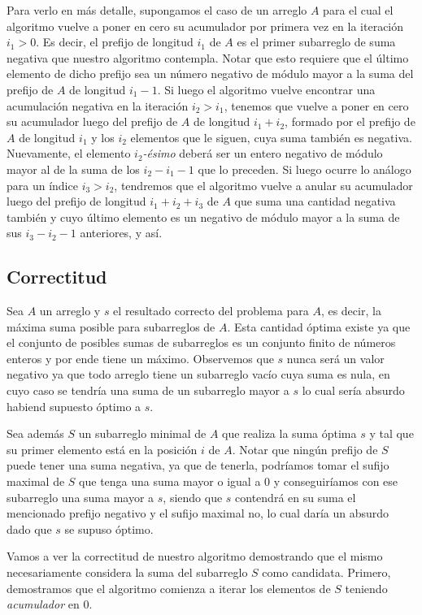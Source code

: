 Para verlo en más detalle, supongamos el caso de un arreglo $A$ para el cual el algoritmo vuelve a poner en cero su acumulador por primera vez en la iteración $i_1 > 0$. Es decir, el prefijo de longitud $i_1$ de $A$ es el primer subarreglo de suma negativa que nuestro algoritmo contempla. Notar que esto requiere que el último elemento de dicho prefijo sea un número negativo de módulo mayor a la suma del prefijo de $A$ de longitud $i_1-1$. Si luego el algoritmo vuelve encontrar una acumulación negativa en la iteración $i_2 > i_1$, tenemos que vuelve a poner en cero su acumulador luego del prefijo de $A$ de longitud $i_1 + i_2$, formado por el prefijo de $A$ de longitud $i_1$ y los $i_2$ elementos que le siguen, cuya suma también es negativa. Nuevamente, el elemento $i_2$\textit{-ésimo} deberá ser un entero negativo de módulo mayor al de la suma de los $i_2-i_1-1$ que lo preceden. Si luego ocurre lo análogo para un índice $i_3 > i_2$, tendremos que el algoritmo vuelve a anular su acumulador luego del prefijo de longitud $i_1 + i_2 + i_3$ de $A$ que suma una cantidad negativa también y cuyo último elemento es un negativo de módulo mayor a la suma de sus $i_3-i_2-1$ anteriores, y así.

\subsection{Correctitud}

Sea $A$ un arreglo y $s$ el resultado correcto del problema para $A$, es decir, la máxima suma posible para subarreglos de $A$. Esta cantidad óptima existe ya que el conjunto de posibles sumas de subarreglos es un conjunto finito de números enteros y por ende tiene un máximo. Observemos que $s$ nunca será un valor negativo ya que todo arreglo tiene un subarreglo vacío cuya suma es nula, en cuyo caso se tendría una suma de un subarreglo mayor a $s$ lo cual sería absurdo habiend supuesto óptimo a $s$.

Sea además $S$ un subarreglo minimal de $A$ que realiza la suma óptima $s$ y tal que su primer elemento está en la posición $i$ de $A$. Notar que ningún prefijo de $S$ puede tener una suma negativa, ya que de tenerla, podríamos tomar el sufijo maximal de $S$ que tenga una suma mayor o igual a $0$ y conseguiríamos con ese subarreglo una suma mayor a $s$, siendo que $s$ contendrá en su suma el mencionado prefijo negativo y el sufijo maximal no, lo cual daría un absurdo dado que $s$ se supuso óptimo.

Vamos a ver la correctitud de nuestro algoritmo demostrando que el mismo necesariamente considera la suma del subarreglo $S$ como candidata. Primero, demostramos que el algoritmo comienza a iterar los elementos de $S$ teniendo \textit{acumulador} en $0$.

